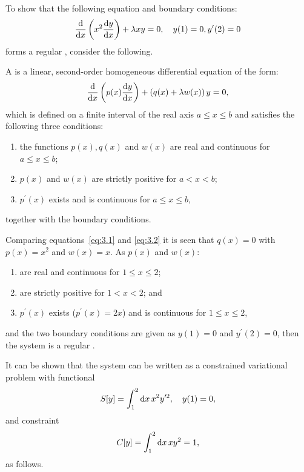 To show that the following equation and boundary conditions:
\begin{equation}
\label{eq:3.1}
	\frac{\mathrm{d}}{\mathrm{d}x}\left(x^2\frac{\mathrm{d}y}{\mathrm{d}x}\right)+\lambda x y = 0,\quad y(1)=0, y^\prime(2)=0
\end{equation}
forms a regular \sls, consider the following.

A \sls is a linear, second-order homogeneous differential equation of the form:
\begin{equation}
\label{eq:3.2}
	\frac{\mathrm{d}}{\mathrm{d}x}\left(p(x)\frac{\mathrm{d}y}{\mathrm{d}x}\right) + \left(q(x) + \lambda w(x)\right) y=0,
\end{equation}
which is defined on a finite interval of the real axis $a\leq x \leq b$ and satisfies the following three conditions:
\begin{enumerate}
  \item 
  the functions $p(x), q(x)$ and $w(x)$ are real and continuous for\\$a\leq x\leq b$;
  \item
  $p(x)$ and $w(x)$ are strictly positive for $a<x<b$;
  \item
  $p^\prime(x)$ exists and is continuous for $a\leq x\leq b$,
\end{enumerate}
together with the boundary conditions.

Comparing equations~\eqref{eq:3.1} and \eqref{eq:3.2} it is seen that $q(x)=0$ with $p(x) = x^2$ and $w(x)=x$. As $p(x)$ and $w(x)$:
\begin{enumerate}
\item
are real and continuous for $1\leq x\leq 2$;
\item
are strictly positive for $1<x<2$; and
\item
$p^\prime(x)$ exists ($p^\prime(x) = 2x$) and is continuous for $1\leq x\leq 2$,
\end{enumerate}
and the two boundary conditions are given as $y(1)=0$ and $y^\prime(2)=0$, then the system is a regular \sls.

It can be shown that the system can be written as a constrained variational problem with functional
\begin{equation}
	\label{eq:3.3}
	S[y] = \int_{1}^{2}\mathrm{d} x\, x^2 y^{\prime 2},\quad y(1) = 0,
\end{equation}
and constraint
\begin{equation}
	\label{eq:3.4}
	C[y] = \int_{1}^{2}\mathrm{d} x\, x y^2 = 1,
\end{equation}
as follows.


